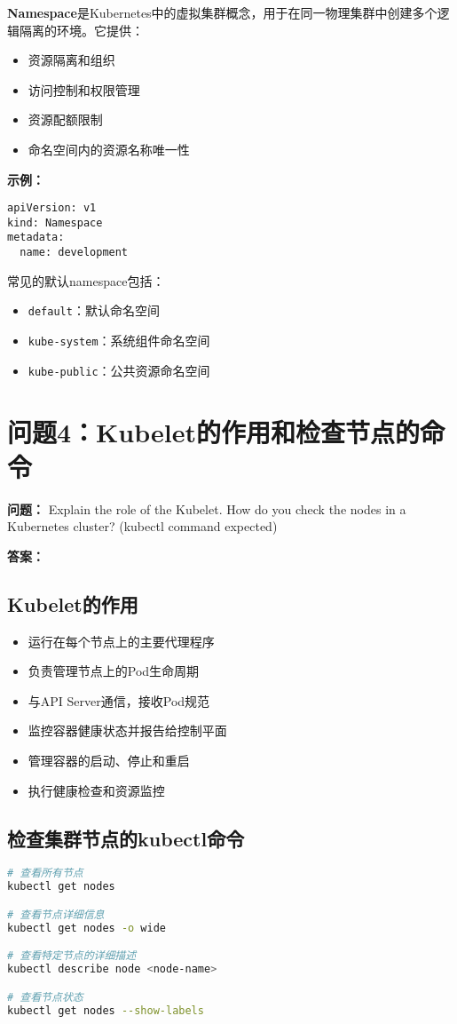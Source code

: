 \documentclass[12pt,a4paper]{article}
\begin{document}
\textbf{Namespace}是Kubernetes中的虚拟集群概念，用于在同一物理集群中创建多个逻辑隔离的环境。它提供：
\begin{itemize}
    \item 资源隔离和组织
    \item 访问控制和权限管理
    \item 资源配额限制
    \item 命名空间内的资源名称唯一性
\end{itemize}

\textbf{示例：}
\begin{lstlisting}
apiVersion: v1
kind: Namespace
metadata:
  name: development
\end{lstlisting}

常见的默认namespace包括：
\begin{itemize}
    \item \texttt{default}：默认命名空间
    \item \texttt{kube-system}：系统组件命名空间
    \item \texttt{kube-public}：公共资源命名空间
\end{itemize}

\section{问题4：Kubelet的作用和检查节点的命令}

\textbf{问题：} Explain the role of the Kubelet. How do you check the nodes in a Kubernetes cluster? (kubectl command expected)

\textbf{答案：}

\subsection{Kubelet的作用}
\begin{itemize}
    \item 运行在每个节点上的主要代理程序
    \item 负责管理节点上的Pod生命周期
    \item 与API Server通信，接收Pod规范
    \item 监控容器健康状态并报告给控制平面
    \item 管理容器的启动、停止和重启
    \item 执行健康检查和资源监控
\end{itemize}

\subsection{检查集群节点的kubectl命令}
\begin{lstlisting}[language=bash]
# 查看所有节点
kubectl get nodes

# 查看节点详细信息
kubectl get nodes -o wide

# 查看特定节点的详细描述
kubectl describe node <node-name>

# 查看节点状态
kubectl get nodes --show-labels
\end{lstlisting}
\end{document}

